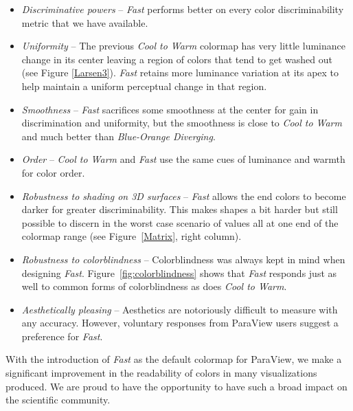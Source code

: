\documentclass{IEEEcsmag}
\newcommand*{\colormap}[1]{\textsl{#1}\xspace}
\newcommand*{\coolwarm}{\colormap{Cool to Warm}}
\newcommand*{\blueorange}{\colormap{Blue-Orange Diverging}}
\newcommand*{\fast}{\colormap{Fast}}
\begin{document}
\begin{itemize}

\item \emph{Discriminative powers} --
  \fast performs better on every color discriminability metric that we have available.
\item \emph{Uniformity} --
  The previous \coolwarm colormap has very little luminance change in its center leaving a region of colors that tend to get washed out (see Figure \ref{Larsen3}).
  \fast retains more luminance variation at its apex to help maintain a uniform perceptual change in that region.
\item \emph{Smoothness} --
  \fast sacrifices some smoothness at the center for gain in discrimination and uniformity, but the smoothness is close to \coolwarm and much better than \blueorange.
\item \emph{Order} --
  \coolwarm and \fast use the same cues of luminance and warmth for color order.
\item \emph{Robustness to shading on 3D surfaces} --
  \fast allows the end colors to become darker for greater discriminability.
  This makes shapes a bit harder but still possible to discern in the worst case scenario of values all at one end of the colormap range (see Figure~\ref{Matrix}, right column).
\item \emph{Robustness to colorblindness} --
  Colorblindness was always kept in mind when designing \fast.
  Figure~\ref{fig:colorblindness} shows that \fast responds just as well to common forms of colorblindness as does \coolwarm.
\item \emph{Aesthetically pleasing} --
  Aesthetics are notoriously difficult to measure with any accuracy.
  However, voluntary responses from ParaView users suggest a preference for \fast.

\end{itemize}



With the introduction of \fast as the default colormap for ParaView, we make a significant improvement in the readability of colors in many visualizations produced. We are proud to have the opportunity to have such a broad impact on the scientific community.
\end{document}
